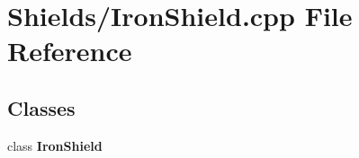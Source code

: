 \section{Shields/\-Iron\-Shield.cpp File Reference}
\label{_iron_shield_8cpp}
\subsection*{Classes}
\begin{DoxyCompactItemize}
\item 
class {\bf Iron\-Shield}
\end{DoxyCompactItemize}
